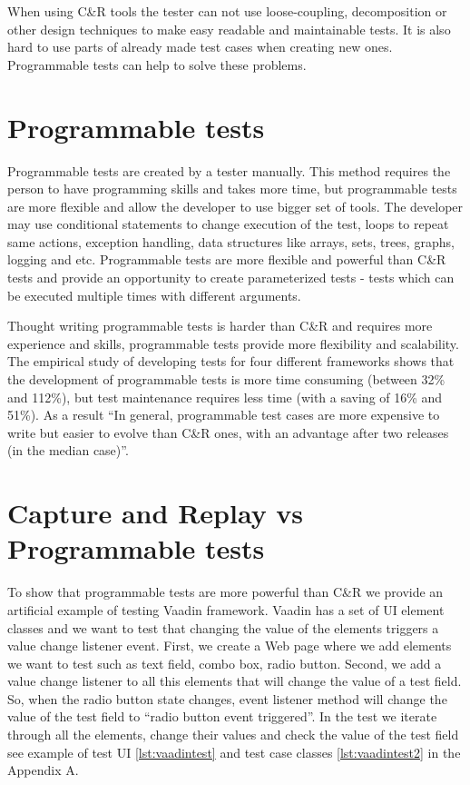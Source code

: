  When using C\&R tools the tester can
not use loose-coupling, decomposition or other design techniques to make
easy readable and maintainable tests. It is also hard to use parts of already
made test cases when creating new ones. Programmable tests can help to solve these problems.

\section{Programmable tests} 
\label{sec:programTests}
Programmable tests are created by a tester manually. This method requires the
person to have programming skills and takes more time, but programmable tests
are more flexible and allow the developer to use bigger set of tools. The
developer may use conditional statements to change execution of the test,
loops to repeat same actions, exception handling, data structures like
arrays, sets, trees, graphs, logging and etc. Programmable tests are more
flexible and powerful than C\&R tests and provide an opportunity to create
parameterized tests - tests which can be executed multiple times with different arguments. 

Thought writing programmable tests is harder than C\&R and requires more
 experience and skills, programmable tests provide more flexibility and scalability. The empirical study
       of developing tests for four different frameworks shows that the development of programmable tests is more time
      consuming (between 32\% and 112\%), but test maintenance requires less
      time (with a saving of 16\% and 51\%). As a result ``In general, programmable test cases are more
      expensive to write but easier to evolve than C\&R ones, with an advantage
      after two releases (in the median case)''.\cite{CaptureReplay7}

 \section{Capture and Replay vs Programmable tests}
 To show that programmable tests are more powerful than C\&R we provide an
artificial example of testing Vaadin framework.	
Vaadin has a set of UI element classes and we want to	test that changing 
the value of the elements triggers a value change listener event.
First, we create a Web page where we add elements we
want to test such as text field, combo box, radio button. Second, we add a value
change listener to all this elements that will change the value of a test field.
So, when the radio button state changes, event listener method
will change the value of the test field to ``radio button event triggered''. In the test we
iterate through all the elements, change their values and check the value
of the test field see example of test UI \ref{lst:vaadintest} and test case
classes \ref{lst:vaadintest2} in the Appendix A.

